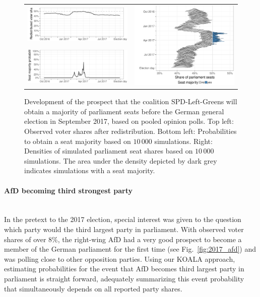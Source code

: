 \documentclass[smallcondensed]{svjour3}     %
\begin{document}
\begin{figure}[H]\centering
\begin{tabular}{ll}
\includegraphics[height=.15\textwidth]{figures/2017_pooled_spdleftgreens_rawSharesRedist.pdf}
&
\multirow{2}{*}[13ex]{\includegraphics[height=30ex]{figures/2017_pooled_spdleftgreens_ridgeline.pdf}}
\\
\includegraphics[height=.15\textwidth]{figures/2017_pooled_spdleftgreens_prob.pdf}
\end{tabular}
\caption{Development of the prospect that the coalition SPD-Left-Greens will
obtain a majority of parliament seats before the German
general election in September 2017, based on pooled opinion polls.
Top left: Observed voter shares after redistribution.
Bottom left: Probabilities to obtain a seat majority based on $10\,000$ simulations.
Right: Densities of simulated parliament seat shares based on $10\,000$ simulations.
The area under the density depicted by dark grey indicates simulations with a
seat majority.
\label{fig:2017_spdleftgreens}
}
\end{figure}


\paragraph{AfD becoming third strongest party} \ \\
In the pretext to the 2017 election, special interest was given to the question
which party would the third largest party in parliament.
With observed voter shares of over $8\%$, the right-wing AfD had a very good
prospect to become a member of the German parliament for the first time
(see Fig.~\ref{fig:2017_afd}) and was polling close to other opposition parties.
Using our KOALA approach, estimating probabilities for the event that AfD becomes
third largest party in parliament is straight forward, adequately summarizing
this event probability that simultaneously depends on all reported party shares.
\end{document}
